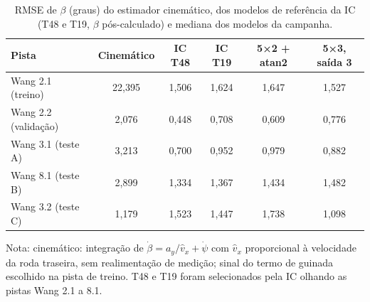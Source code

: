 \begin{table}[htbp]
    \centering
    \caption{RMSE de $\beta$ (graus) do estimador cinemático, dos modelos de referência da IC (T48 e T19, $\beta$ pós-calculado) e mediana dos modelos da campanha.}
    \label{tab:referencias_beta}
    \footnotesize
    \begin{tabular}{lccccc}
        \toprule
        \textbf{Pista} & \textbf{Cinemático} & \textbf{IC T48} & \textbf{IC T19} & \textbf{5×2 + atan2} & \textbf{5×3, saída 3} \\
        \midrule
        Wang 2.1 (treino) & 22,395 & 1,506 & 1,624 & 1,647 & 1,527 \\
        Wang 2.2 (validação) & 2,076 & 0,448 & 0,708 & 0,609 & 0,776 \\
        Wang 3.1 (teste A) & 3,213 & 0,700 & 0,952 & 0,979 & 0,882 \\
        Wang 8.1 (teste B) & 2,899 & 1,334 & 1,367 & 1,434 & 1,482 \\
        Wang 3.2 (teste C) & 1,179 & 1,523 & 1,447 & 1,738 & 1,098 \\
        \bottomrule
    \end{tabular}
    \par\footnotesize Nota: cinemático: integração de $\dot\beta = a_y/\hat v_x + \dot\psi$ com $\hat v_x$ proporcional à velocidade da roda traseira, sem realimentação de medição; sinal do termo de guinada escolhido na pista de treino. T48 e T19 foram selecionados pela IC olhando as pistas Wang 2.1 a 8.1.
\end{table}

